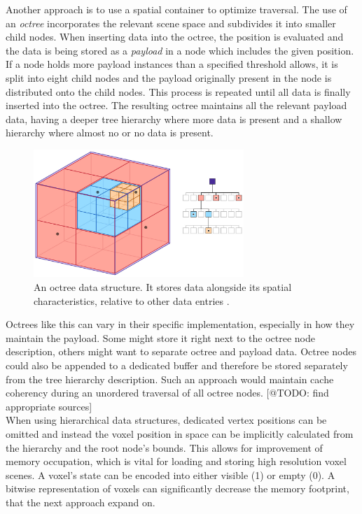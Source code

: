 Another approach is to use a spatial container to optimize traversal. The use of an \emph{octree} 
incorporates the relevant scene space and subdivides it into smaller child nodes. When inserting data 
into the octree, the position is evaluated and the data is being stored as a \emph{payload} in 
a node which includes the given position. If a node holds more payload instances than a specified threshold 
allows, it is split into eight child nodes and the payload originally present in the node is 
distributed onto the child nodes. This process is repeated until all data is finally inserted 
into the octree. The resulting octree maintains all the relevant payload data, having a deeper tree 
hierarchy where more data is present and a shallow hierarchy where almost no or no data is present.

\begin{figure}[h]
    \centering
    \includegraphics[width=300px]{images/graphics/octree.jpg}
    \caption{An octree data structure. It stores data alongside its spatial characteristics, relative to 
    other data entries \cite{Six2021}.}
    \label{fig:octree}
\end{figure}

\noindent
Octrees like this can vary in their specific implementation, especially in how they maintain the 
payload. Some might store it right next to the octree node description, others might want to separate 
octree and payload data. Octree nodes could also be appended to a dedicated buffer and therefore be stored 
separately from the tree hierarchy description. Such an approach would maintain cache coherency during an 
unordered traversal of all octree nodes. [@TODO: find appropriate sources]\\

\noindent
When using hierarchical data structures, dedicated vertex positions can be omitted and instead 
the voxel position in space can be implicitly calculated from the hierarchy and the root node's bounds. 
This allows for improvement of memory occupation, which is vital for loading and storing high 
resolution voxel scenes. A voxel's state can be encoded into either visible (1) or empty (0).
A bitwise representation of voxels can significantly decrease the memory footprint, that the next 
approach expand on.


